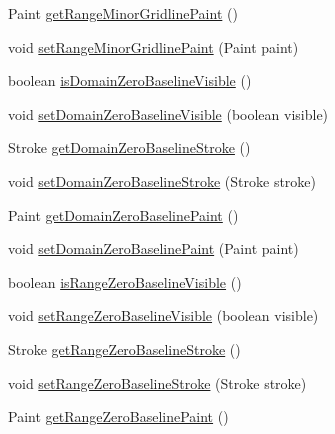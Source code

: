 \begin{DoxyCompactItemize}
\item 
Paint \mbox{\hyperlink{classorg_1_1jfree_1_1chart_1_1plot_1_1_x_y_plot_a159858bb023850b61558031e98e7c2d4}{get\+Range\+Minor\+Gridline\+Paint}} ()
\item 
void \mbox{\hyperlink{classorg_1_1jfree_1_1chart_1_1plot_1_1_x_y_plot_acc1ac8ab3f7e5f4fb3d69723c1bc8b09}{set\+Range\+Minor\+Gridline\+Paint}} (Paint paint)
\item 
boolean \mbox{\hyperlink{classorg_1_1jfree_1_1chart_1_1plot_1_1_x_y_plot_aab7624f32aa6785f5d6b25c68f35e489}{is\+Domain\+Zero\+Baseline\+Visible}} ()
\item 
void \mbox{\hyperlink{classorg_1_1jfree_1_1chart_1_1plot_1_1_x_y_plot_ac7550f7b8a62959de2654cfe50970e36}{set\+Domain\+Zero\+Baseline\+Visible}} (boolean visible)
\item 
Stroke \mbox{\hyperlink{classorg_1_1jfree_1_1chart_1_1plot_1_1_x_y_plot_ab83221c2254542e462bbff89d09e66e9}{get\+Domain\+Zero\+Baseline\+Stroke}} ()
\item 
void \mbox{\hyperlink{classorg_1_1jfree_1_1chart_1_1plot_1_1_x_y_plot_ad1aceb453eac28dec65962270a491361}{set\+Domain\+Zero\+Baseline\+Stroke}} (Stroke stroke)
\item 
Paint \mbox{\hyperlink{classorg_1_1jfree_1_1chart_1_1plot_1_1_x_y_plot_ac5e572ae0c60a41e40abfa670caa66e7}{get\+Domain\+Zero\+Baseline\+Paint}} ()
\item 
void \mbox{\hyperlink{classorg_1_1jfree_1_1chart_1_1plot_1_1_x_y_plot_a9edcbc7a87e2dcd4a7972a5218bd4ea3}{set\+Domain\+Zero\+Baseline\+Paint}} (Paint paint)
\item 
boolean \mbox{\hyperlink{classorg_1_1jfree_1_1chart_1_1plot_1_1_x_y_plot_a9823b60560beb39d4a8a786d5e44bea0}{is\+Range\+Zero\+Baseline\+Visible}} ()
\item 
void \mbox{\hyperlink{classorg_1_1jfree_1_1chart_1_1plot_1_1_x_y_plot_a51560b2df5cce8d8565595c9f74981bb}{set\+Range\+Zero\+Baseline\+Visible}} (boolean visible)
\item 
Stroke \mbox{\hyperlink{classorg_1_1jfree_1_1chart_1_1plot_1_1_x_y_plot_a4e1e66786df0c680c395061558176470}{get\+Range\+Zero\+Baseline\+Stroke}} ()
\item 
void \mbox{\hyperlink{classorg_1_1jfree_1_1chart_1_1plot_1_1_x_y_plot_ad6e0bfc216bd1280fac3de9cb311f13e}{set\+Range\+Zero\+Baseline\+Stroke}} (Stroke stroke)
\item 
Paint \mbox{\hyperlink{classorg_1_1jfree_1_1chart_1_1plot_1_1_x_y_plot_ae0e06c4efef9b49e9c8e945f1451a991}{get\+Range\+Zero\+Baseline\+Paint}} ()
\item 

\end{DoxyCompactItemize}
